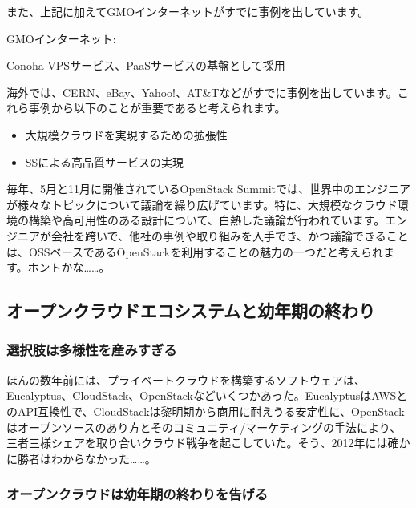 \documentclass[9pt,b5paper,tombo,openany,dvipdfmx]{jsbook}
\begin{document}
また、上記に加えてGMOインターネットがすでに事例を出しています。

GMOインターネット:

Conoha VPSサービス、PaaSサービスの基盤として採用

海外では、CERN、eBay、Yahoo!、AT\&Tなどがすでに事例を出しています。これら事例から以下のことが重要であると考えられます。

\begin{itemize}
	\item 大規模クラウドを実現するための拡張性
	\item SSによる高品質サービスの実現
\end{itemize}

毎年、5月と11月に開催されているOpenStack Summitでは、世界中のエンジニアが様々なトピックについて議論を繰り広げています。特に、大規模なクラウド環境の構築や高可用性のある設計について、白熱した議論が行われています。エンジニアが会社を跨いで、他社の事例や取り組みを入手でき、かつ議論できることは、OSSベースであるOpenStackを利用することの魅力の一つだと考えられます。ホントかな……。

\subsection{オープンクラウドエコシステムと幼年期の終わり}

\subsubsection{選択肢は多様性を産みすぎる}

ほんの数年前には、プライベートクラウドを構築するソフトウェアは、Eucalyptus、CloudStack、OpenStackなどいくつかあった。EucalyptusはAWSとのAPI互換性で、CloudStackは黎明期から商用に耐えうる安定性に、OpenStackはオープンソースのあり方とそのコミュニティ/マーケティングの手法により、三者三様シェアを取り合いクラウド戦争を起こしていた。そう、2012年には確かに勝者はわからなかった……。

\subsubsection{オープンクラウドは幼年期の終わりを告げる}
\end{document}
